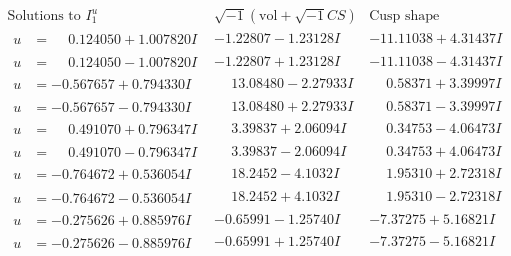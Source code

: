 \documentclass[1p]{elsarticle_modified}
\theoremstyle{definition}
\newcommand{\I}{\sqrt{-1}}
\begin{document}
$$\begin{array}{c|c|c}  
\text{Solutions to }I^u_{1}& \I (\text{vol} + \sqrt{-1}CS) & \text{Cusp shape}\\
 \hline 
\begin{aligned}
u &= \phantom{-}0.124050 + 1.007820 I\end{aligned}
 & -1.22807 - 1.23128 I & -11.11038 + 4.31437 I \\ \hline\begin{aligned}
u &= \phantom{-}0.124050 - 1.007820 I\end{aligned}
 & -1.22807 + 1.23128 I & -11.11038 - 4.31437 I \\ \hline\begin{aligned}
u &= -0.567657 + 0.794330 I\end{aligned}
 & \phantom{-}13.08480 - 2.27933 I & \phantom{-}0.58371 + 3.39997 I \\ \hline\begin{aligned}
u &= -0.567657 - 0.794330 I\end{aligned}
 & \phantom{-}13.08480 + 2.27933 I & \phantom{-}0.58371 - 3.39997 I \\ \hline\begin{aligned}
u &= \phantom{-}0.491070 + 0.796347 I\end{aligned}
 & \phantom{-}3.39837 + 2.06094 I & \phantom{-}0.34753 - 4.06473 I \\ \hline\begin{aligned}
u &= \phantom{-}0.491070 - 0.796347 I\end{aligned}
 & \phantom{-}3.39837 - 2.06094 I & \phantom{-}0.34753 + 4.06473 I \\ \hline\begin{aligned}
u &= -0.764672 + 0.536054 I\end{aligned}
 & \phantom{-}18.2452 - 4.1032 I & \phantom{-}1.95310 + 2.72318 I \\ \hline\begin{aligned}
u &= -0.764672 - 0.536054 I\end{aligned}
 & \phantom{-}18.2452 + 4.1032 I & \phantom{-}1.95310 - 2.72318 I \\ \hline\begin{aligned}
u &= -0.275626 + 0.885976 I\end{aligned}
 & -0.65991 - 1.25740 I & -7.37275 + 5.16821 I \\ \hline\begin{aligned}
u &= -0.275626 - 0.885976 I\end{aligned}
 & -0.65991 + 1.25740 I & -7.37275 - 5.16821 I \\ \hline\begin{aligned}

\end{aligned}
\end{array}$$
\end{document}
